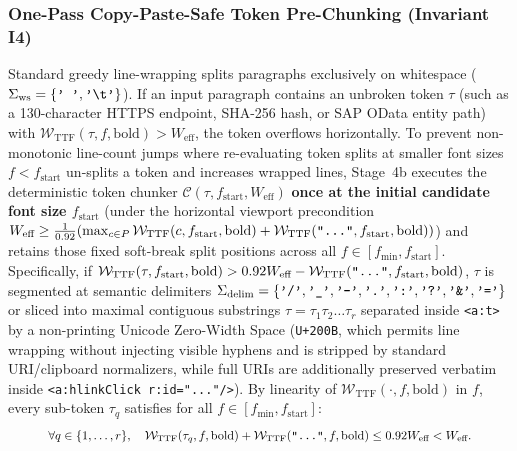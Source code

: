 \documentclass[10pt,journal,compsoc]{IEEEtran}
\begin{document}
\subsubsection{One-Pass Copy-Paste-Safe Token Pre-Chunking (Invariant I4)}
Standard greedy line-wrapping splits paragraphs exclusively on whitespace ($\Sigma_{\text{ws}} = \{\text{\texttt{' '}}, \text{\texttt{'\textbackslash t'}}\}$). If an input paragraph contains an unbroken token $\tau$ (such as a 130-character HTTPS endpoint, SHA-256 hash, or SAP OData entity path) with $\mathcal{W}_{\text{TTF}}(\tau, f, \text{bold}) > W_{\text{eff}}$, the token overflows horizontally. To prevent non-monotonic line-count jumps where re-evaluating token splits at smaller font sizes $f < f_{\text{start}}$ un-splits a token and increases wrapped lines, Stage~4b executes the deterministic token chunker $\mathcal{C}(\tau, f_{\text{start}}, W_{\text{eff}})$ \textbf{once at the initial candidate font size $f_{\text{start}}$} (under the horizontal viewport precondition $W_{\text{eff}} \ge \frac{1}{0.92}(\max_{c \in P} \mathcal{W}_{\text{TTF}}(c, f_{\text{start}}, \text{bold}) + \mathcal{W}_{\text{TTF}}(\text{\texttt{"..."}}, f_{\text{start}}, \text{bold}))$) and retains those fixed soft-break split positions across all $f \in [f_{\min}, f_{\text{start}}]$. Specifically, if $\mathcal{W}_{\text{TTF}}(\tau, f_{\text{start}}, \text{bold}) > 0.92 W_{\text{eff}} - \mathcal{W}_{\text{TTF}}(\text{\texttt{"..."}}, f_{\text{start}}, \text{bold})$, $\tau$ is segmented at semantic delimiters $\Sigma_{\text{delim}} = \{\text{\texttt{'/'}}, \allowbreak \text{\texttt{'\_'}}, \allowbreak \text{\texttt{'-'}}, \allowbreak \text{\texttt{'.'}}, \allowbreak \text{\texttt{':'}}, \allowbreak \text{\texttt{'?'}}, \allowbreak \text{\texttt{'\&'}}, \allowbreak \text{\texttt{'='}}\}$ or sliced into maximal contiguous substrings $\tau = \tau_1 \tau_2 \dots \tau_r$ separated inside \texttt{<a:t>} by a non-printing Unicode Zero-Width Space (\texttt{U+200B}, which permits line wrapping without injecting visible hyphens and is stripped by standard URI/clipboard normalizers, while full URIs are additionally preserved verbatim inside \texttt{<a:hlinkClick r:id="..."/>}). By linearity of $\mathcal{W}_{\text{TTF}}(\cdot, f, \text{bold})$ in $f$, every sub-token $\tau_q$ satisfies for all $f \in [f_{\min}, f_{\text{start}}]$:
\begin{equation}
\resizebox{0.88\columnwidth}{!}{$\displaystyle
    \forall q \in \{1, \dots, r\}, \quad \mathcal{W}_{\text{TTF}}(\tau_q, f, \text{bold}) + \mathcal{W}_{\text{TTF}}(\text{\texttt{"..."}}, f, \text{bold}) \le 0.92 W_{\text{eff}} < W_{\text{eff}}.
$}
\label{eq:chunk_bound}
\end{equation}
\end{document}
